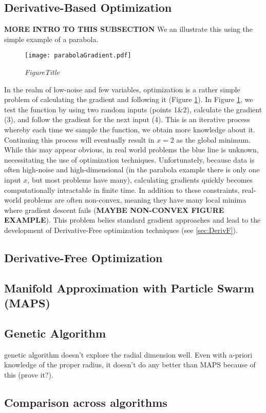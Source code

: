 \subsection*{Derivative-Based Optimization}
\label{sec:DerivB}
\textbf{MORE INTRO TO THIS SUBSECTION}
We an illustrate this using the simple example of a parabola. 
\begin{figure}
	\centering
	\texttt{[image: parabolaGradient.pdf]} 
	\caption{\textit{FigureTitle}}
	\label{fig:parabolaGradient}
\end{figure}
In the realm of low-noise and few variables, optimization is a rather simple problem of calculating the gradient and following it (Figure \ref{fig:parabolaGradient}). In Figure \ref{fig:parabolaGradient}, we test the function by using two random inputs (points 1\&2), calculate the gradient (3), and follow the gradient for the next input (4). This is an iterative process whereby each time we sample the function, we obtain more knowledge about it. Continuing this process will eventually result in $x=2$ as the global minimum. While this may appear obvious, in real world problems the blue line is unknown, necessitating the use of optimization techniques.
Unfortunately, because data is often high-noise and high-dimensional (in the parabola example there is only one input $x$, but most problems have many), calculating gradients quickly becomes computationally intractable in finite time. In addition to these constraints, real-world problems are often non-convex, meaning they have many local minima where gradient descent fails (\textbf{MAYBE NON-CONVEX FIGURE EXAMPLE}). This problem belies standard gradient approaches and lead to the development of Derivative-Free optimization techniques (see \ref{sec:DerivF}).

\subsection*{Derivative-Free Optimization}
\label{sec:DerivF}
\subsection*{Manifold Approximation with Particle Swarm (MAPS)}
\subsection*{Genetic Algorithm}
genetic algorithm doesn't explore the radial dimension well. Even with a-priori knowledge of the proper radius, it doesn't do any better than MAPS because of this (prove it?).

\subsection*{Comparison across algorithms}







 
